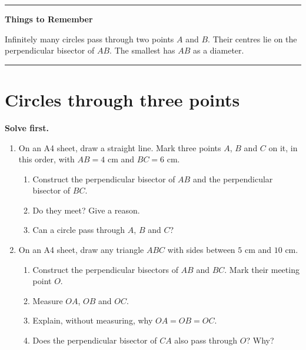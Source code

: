 \documentclass[11pt,a4paper]{article}
\theoremstyle{branddef}
\newcounter{prob}
\newenvironment{solvefirst}
  {\par\smallskip\noindent\textbf{Solve first.}
   \begin{enumerate}[label=\textbf{P\arabic*.},leftmargin=2.2em,itemsep=3pt,start=\numexpr\value{prob}+1\relax]}
  {\setcounter{prob}{\value{enumi}}\end{enumerate}}
\newcommand{\rememberbox}[1]{%
  \par\medskip\noindent\textcolor{black!35}{\rule{\linewidth}{0.4pt}}\par\nointerlineskip\vspace{4pt}
  \noindent\textbf{Things to Remember}\par\smallskip #1\par\vspace{3pt}
  \noindent\textcolor{black!35}{\rule{\linewidth}{0.4pt}}\par\medskip}
\begin{document}
\rememberbox{Infinitely many circles pass through two points $A$ and $B$. Their centres lie on the perpendicular bisector of $AB$. The smallest has $AB$ as a diameter.}

\section{Circles through three points}

\begin{solvefirst}
  \item On an A4 sheet, draw a straight line. Mark three points $A$, $B$ and $C$ on it, in this order, with $AB=4$ cm and $BC=6$ cm.
  \begin{enumerate}[label=(\alph*),itemsep=1pt]
    \item Construct the perpendicular bisector of $AB$ and the perpendicular bisector of $BC$.
    \item Do they meet? Give a reason.
    \item Can a circle pass through $A$, $B$ and $C$?
  \end{enumerate}
  \item On an A4 sheet, draw any triangle $ABC$ with sides between $5$ cm and $10$ cm.
  \begin{enumerate}[label=(\alph*),itemsep=1pt]
    \item Construct the perpendicular bisectors of $AB$ and $BC$. Mark their meeting point $O$.
    \item Measure $OA$, $OB$ and $OC$.
    \item Explain, without measuring, why $OA=OB=OC$.
    \item Does the perpendicular bisector of $CA$ also pass through $O$? Why?
  \end{enumerate}
\end{solvefirst}
\end{document}
